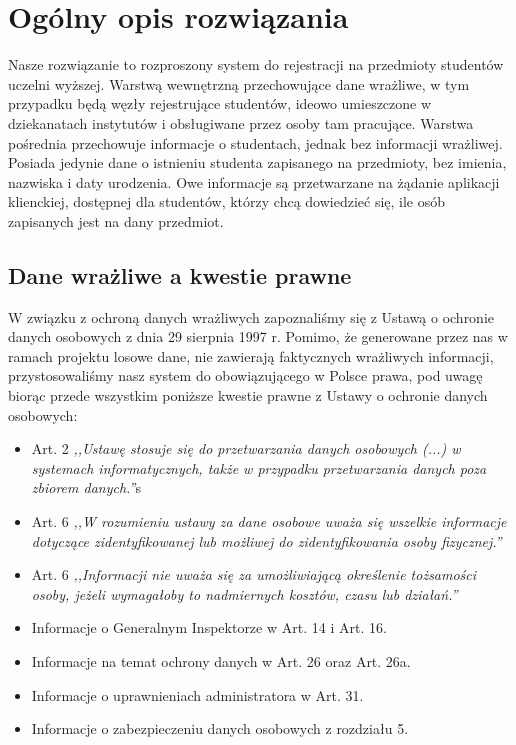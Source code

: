 \section[Ogólny opis rozwiązania]{Ogólny opis rozwiązania}

\par{Nasze rozwiązanie to rozproszony system do rejestracji na przedmioty studentów uczelni wyższej. Warstwą wewnętrzną przechowujące dane wrażliwe, w tym przypadku będą węzły rejestrujące studentów, ideowo umieszczone w dziekanatach instytutów i obsługiwane przez osoby tam pracujące. Warstwa pośrednia przechowuje informacje o studentach, jednak bez informacji wrażliwej. Posiada jedynie dane o istnieniu studenta zapisanego na przedmioty, bez imienia, nazwiska i daty urodzenia. Owe informacje są przetwarzane na żądanie aplikacji klienckiej, dostępnej dla studentów, którzy chcą dowiedzieć się, ile osób zapisanych jest na dany przedmiot.}

\subsection[Dane wrażliwe a kwestie prawne]{Dane wrażliwe a kwestie prawne}

\par{W związku z ochroną danych wrażliwych zapoznaliśmy się z Ustawą o ochronie danych osobowych z dnia 29 sierpnia 1997 r. Pomimo, że generowane przez nas w ramach projektu losowe dane, nie zawierają faktycznych wrażliwych informacji, przystosowaliśmy nasz system do obowiązującego w Polsce prawa, pod uwagę biorąc przede wszystkim poniższe kwestie prawne z Ustawy o ochronie danych osobowych:}
\begin{itemize}
\item Art. 2 \textit{,,Ustawę stosuje się do przetwarzania danych osobowych (...) w systemach informatycznych, także w przypadku przetwarzania danych poza zbiorem danych.''}s
\item Art. 6 \textit{,,W rozumieniu ustawy za dane osobowe uważa się wszelkie informacje dotyczące zidentyfikowanej lub możliwej do zidentyfikowania osoby fizycznej.''}
\item Art. 6 \textit{,,Informacji nie uważa się za umożliwiającą określenie tożsamości osoby, jeżeli wymagałoby to nadmiernych kosztów, czasu lub działań.''}
\item Informacje o Generalnym Inspektorze w Art. 14 i Art. 16.
\item Informacje na temat ochrony danych w Art. 26 oraz Art. 26a.
\item Informacje o uprawnieniach administratora w Art. 31.
\item Informacje o zabezpieczeniu danych osobowych z rozdziału 5.
\end{itemize}

